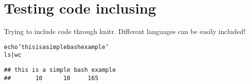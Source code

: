 \documentclass[output=inprep,
		biblatex
		]{LSP/langsci}\usepackage[]{graphicx}\usepackage[]{color}
\makeatletter
\newenvironment{kframe}{%
 \def\at@end@of@kframe{}%
 \ifinner\ifhmode%
  \def\at@end@of@kframe{\end{minipage}}%
  \begin{minipage}{\columnwidth}%
 \fi\fi%
 \def\FrameCommand##1{\hskip\@totalleftmargin \hskip-\fboxsep
 \colorbox{shadecolor}{##1}\hskip-\fboxsep
     \hskip-\linewidth \hskip-\@totalleftmargin \hskip\columnwidth}%
 \MakeFramed {\advance\hsize-\width
   \@totalleftmargin\z@ \linewidth\hsize
   \@setminipage}}%
 {\par\unskip\endMakeFramed%
 \at@end@of@kframe}
\newenvironment{knitrout}{}{} %
\makeatother
\begin{document}
\maketitle
\frontmatter
% 
% 
% 
\tableofcontents
\mainmatter%















\chapter{Testing code inclusing}

Trying to include code through knitr. Different languages can be easily 
included!

\begin{knitrout}\scriptsize
{}\color{fgcolor}\begin{kframe}
\begin{alltt}
echo 'this is a simple bash example'
ls | wc
\end{alltt}

\begin{verbatim}
## this is a simple bash example
##       10      10     165
\end{verbatim}
\end{kframe}
\end{knitrout}
\end{document}
